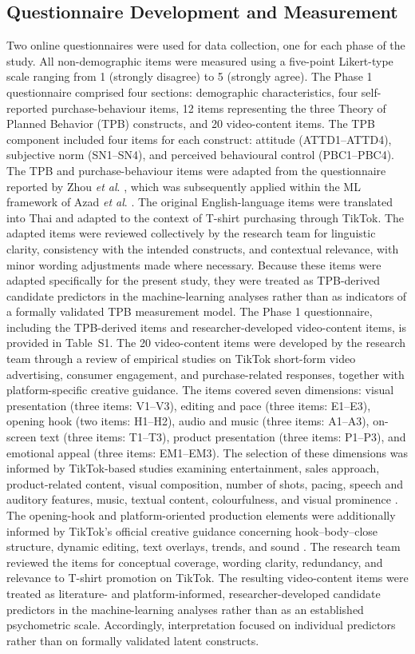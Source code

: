 \documentclass[jtaer,article,submit,moreauthors]{Definitions/mdpi}
\begin{document}
\subsection{Questionnaire Development and Measurement}

Two online questionnaires were used for data collection, one for each phase of the study. All non-demographic items were measured using a five-point Likert-type scale ranging from 1 (strongly disagree) to 5 (strongly agree).
The Phase 1 questionnaire comprised four sections: demographic characteristics, four self-reported purchase-behaviour items, 12 items representing the three Theory of Planned Behavior (TPB) constructs, and 20 video-content items. The TPB component included four items for each construct: attitude (ATTD1--ATTD4), subjective norm (SN1--SN4), and perceived behavioural control (PBC1--PBC4). The TPB and purchase-behaviour items were adapted from the questionnaire reported by Zhou \textit{et al}. \cite{Zhou2022}, which was subsequently applied within the ML framework of Azad \textit{et al}. \cite{Azad2023}. The original English-language items were translated into Thai and adapted to the context of T-shirt purchasing through TikTok. The adapted items were reviewed collectively by the research team for linguistic clarity, consistency with the intended constructs, and contextual relevance, with minor wording adjustments made where necessary. Because these items were adapted specifically for the present study, they were treated as TPB-derived candidate predictors in the machine-learning analyses rather than as indicators of a formally validated TPB measurement model. The Phase 1 questionnaire, including the TPB-derived items and researcher-developed video-content items, is provided in Table~S1.
The 20 video-content items were developed by the research team through a review of empirical studies on TikTok short-form video advertising, consumer engagement, and purchase-related responses, together with platform-specific creative guidance. The items covered seven dimensions: visual presentation (three items: V1--V3), editing and pace (three items: E1--E3), opening hook (two items: H1--H2), audio and music (three items: A1--A3), on-screen text (three items: T1--T3), product presentation (three items: P1--P3), and emotional appeal (three items: EM1--EM3).
The selection of these dimensions was informed by TikTok-based studies examining entertainment, sales approach, product-related content, visual composition, number of shots, pacing, speech and auditory features, music, textual content, colourfulness, and visual prominence \cite{Xiao2023,Meng2024,Zhang2025}. The opening-hook and platform-oriented production elements were additionally informed by TikTok's official creative guidance concerning hook--body--close structure, dynamic editing, text overlays, trends, and sound \cite{TikTokCreativeGuidance2025}. The research team reviewed the items for conceptual coverage, wording clarity, redundancy, and relevance to T-shirt promotion on TikTok. The resulting video-content items were treated as literature- and platform-informed, researcher-developed candidate predictors in the machine-learning analyses rather than as an established psychometric scale. Accordingly, interpretation focused on individual predictors rather than on formally validated latent constructs.
\end{document}
